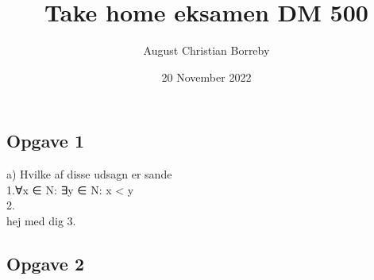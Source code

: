 \documentclass{article}
\title{Take home eksamen DM 500}
\author{August Christian Borreby}
\date{20 November 2022}
\begin{document}
\maketitle
\subsection{Opgave 1}
a) Hvilke af disse udsagn er sande \\
    1.∀x ∈ N: ∃y ∈ N: x < y \\
    2. \\ hej med dig
    3. \\

\subsection{Opgave 2
}








    
\end{document}
